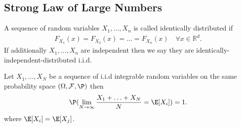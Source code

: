 \subsection{Strong Law of Large Numbers}
\begin{definition}
 A sequence of random variables $X_{1},\ldots ,X_n$  is called identically distributed if 
 \begin{align*}
   F_{X_{1}}(x)= F_{X_{2}}(x) = \ldots  = F_{X_n}(x) \quad \forall x \in  \mathbb{R}^{d}  
 .\end{align*}
 If additionally $X_{1},\ldots ,X_n$ are independent then we say they are identically-independent-distributed i.i.d.
\end{definition}
\begin{theorem}
 Let $X_{1},\ldots ,X_N$  be a sequence of i.i.d integrable random variables on the same probability
 space $(\Omega ,\mathcal{F},\P)$ then 
 \begin{align*}
   \P(\lim_{N \to  \infty} \frac{X_1 + \ldots  + X_N}{N} = \E[X_i]) = 1
 .\end{align*}
 where $\E[X_i] = \E[X_j]$.
\end{theorem}
